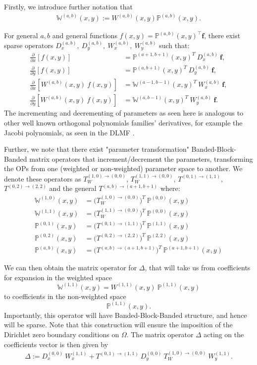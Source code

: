 \documentclass[11pt, oneside]{article}   	%
\newcommand{\bigP}{\mathbb{P}}
\newcommand{\Wab}{{W^{(a,b)}}}
\newcommand{\bigPab}{\bigP^{(a,b)}}
\newcommand{\Wii}{W^{(1,1)}}
\newcommand{\bigPii}{{\mathbb{P}^{(1,1)}}}
\newcommand{\dx}{\frac{\partial}{\partial x}}
\newcommand{\dy}{\frac{\partial}{\partial y}}
\newcommand{\bigW}{\mathbb{W}}
\newcommand{\bigWab}{\mathbb{W}^{(a,b)}}
\newcommand{\bigWii}{{\mathbb{W}^{(1,1)}}}
\begin{document}
Firstly, we introduce further notation that
\begin{align}
\bigWab(x,y) := \Wab(x,y) \bigPab(x,y).
\end{align}

For general \(a,b\) and general functions \(f(x,y) = \bigPab(x,y)^\top \mathbf{f}\), there exist sparse operators \(D_x^{(a,b)}, \: D_y^{(a,b)}, \: W_x^{(a,b)}, \: W_y^{(a,b)}\) such that:
\begin{align}
\dx[f(x,y)] &= \bigP^{(a+1,b+1)}(x,y)^T \: D_x^{(a,b)} \: \mathbf{f}, \\
\dy[f(x,y)] &= \bigP^{(a,b+1)}(x,y)^T \: D_y^{(a,b)} \: \mathbf{f}, \\
\dx[\Wab(x,y) \: f(x,y)] &= \bigW^{(a-1,b-1)}(x,y)^T \: W_x^{(a,b)} \: \mathbf{f}, \\
\dy[\Wab(x,y) \: f(x,y)] &= \bigW^{(a,b-1)}(x,y)^T \: W_y^{(a,b)} \: \mathbf{f}.
\end{align}
The incrementing and decrementing of parameters as seen here is analogous to other well known orthogonal polynomials families' derivatives, for example the Jacobi polynomials, as seen in the DLMF \cite{DLMFDerivatives}.

Further, we note that there exist "parameter transformation" Banded-Block-Banded matrix operators that increment/decrement the parameters, transforming the OPs from one (weighted or non-weighted) parameter space to another. We denote these operators as $T_W^{(1,0)\to(0,0)}$, $T_W^{(1,1)\to(0,0)}$, $T^{(0,1)\to(1,1)}$, $T^{(0,2)\to(2,2)}$ and the general $T^{(a,b)\to(a+1,b+1)}$ where:
\begin{align}
\bigW^{(1,0)}(x,y) &= \Big(T_W^{(1,0)\to(0,0)} \Big)^T \: \bigP^{(0,0)}(x,y) \\
\bigW^{(1,1)}(x,y) &= \Big(T_W^{(1,1)\to(0,0)} \Big)^T \: \bigP^{(0,0)}(x,y) \\
\bigP^{(0,1)}(x,y) &= \Big(T^{(0,1)\to(1,1)} \Big)^T \: \bigP^{(1,1)}(x,y) \\
\bigP^{(0,2)}(x,y) &= \Big(T^{(0,2)\to(2,2)} \Big)^T \: \bigP^{(2,2)}(x,y) \\
\bigP^{(a,b)}(x,y) &= \Big(T^{(a,b)\to(a+1,b+1)} \Big)^T \: \bigP^{(a+1,b+1)}(x,y)
\end{align}

We can then obtain the matrix operator for \(\Delta\), that will take us from coefficients for expansion in the weighted space
\[
\bigWii(x,y) = \Wii(x,y) \: \bigPii(x,y)
\]
to coefficients in the non-weighted space
\[
\bigPii(x,y).
\]
Importantly, this operator will have Banded-Block-Banded structure, and hence will be sparse. Note that this construction will ensure the imposition of the Dirichlet zero boundary conditions on $\Omega$. The matrix operator \(\Delta\) acting on the coefficients vector is then given by
\begin{align}
    \Delta := D_x^{(0,0)} \: W_x^{(1,1)} + T^{(0,1)\to(1,1)} \: D_y^{(0,0)} \: T_W^{(1,0)\to(0,0)} \: W_y^{(1,1)}.
\end{align}
\end{document}
